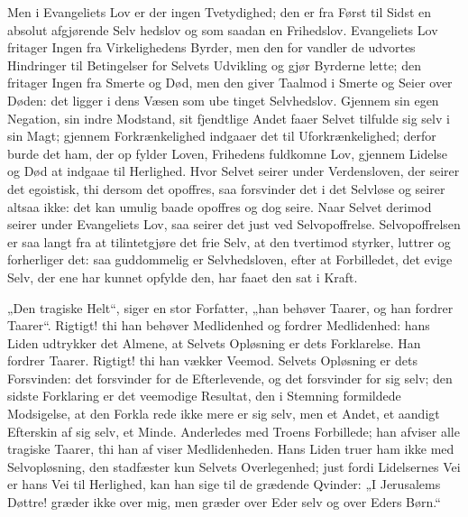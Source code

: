 \documentclass[12pt]{book}
\newcommand{\opage}[1]{\marginnote{\footnotesize\textit{[#1]}}}
\begin{document}
Men i Evangeliets Lov er der ingen Tvetydighed;
den er fra Først til Sidst en absolut afgjørende Selv\-%
hedslov og som saadan en Frihedslov. Evangeliets Lov
fritager Ingen fra Virkelighedens Byrder, men den for\-%
vandler de udvortes Hindringer til Betingelser for Selvets
Udvikling og gjør Byrderne lette; den fritager Ingen
fra Smerte og Død, men den giver Taalmod i Smerte
og Seier over Døden: det ligger i dens Væsen som ube\-%
tinget Selvhedslov. Gjennem sin egen Negation, sin
indre Modstand, sit fjendtlige Andet faaer Selvet tilfulde
sig selv i sin Magt; gjennem Forkrænkelighed indgaaer
det til Uforkrænkelighed; derfor burde det ham, der op\-%
fylder Loven, Frihedens fuldkomne Lov, gjennem Lidelse
og Død at indgaae til Herlighed. Hvor Selvet seirer
under Verdensloven, der seirer det egoistisk, thi dersom
det opoffres, saa forsvinder det i det Selvløse og seirer
altsaa ikke: det kan umulig baade opoffres og dog seire.
Naar Selvet derimod seirer under Evangeliets Lov, saa
seirer det just ved Selvopoffrelse. Selvopoffrelsen er saa
langt fra at tilintetgjøre det frie Selv, at den tvertimod
styrker, luttrer og forherliger det: saa guddommelig er
Selvhedsloven, efter at Forbilledet, det evige Selv, der ene
har kunnet opfylde den, har faaet den sat i Kraft.

„Den tragiske Helt“, siger en stor Forfatter, „han
behøver Taarer, og han fordrer Taarer“. Rigtigt! thi
han behøver Medlidenhed og fordrer Medlidenhed: hans
Liden udtrykker det Almene, at Selvets Opløsning er
dets Forklarelse. Han fordrer Taarer. Rigtigt! thi han
vækker Veemod. Selvets Opløsning er dets Forsvinden:
det forsvinder for de Efterlevende, og det forsvinder for
sig selv; den sidste Forklaring er det veemodige Resultat,
\opage{46}\setcounter{footnote}{0}%
den i Stemning formildede Modsigelse, at den Forkla\-%
rede ikke mere er sig selv, men et Andet, et aandigt
Efterskin af sig selv, et Minde. Anderledes med Troens
Forbillede; han afviser alle tragiske Taarer, thi han af\-%
viser Medlidenheden. Hans Liden truer ham ikke med
Selvopløsning, den stadfæster kun Selvets Overlegenhed;
just fordi Lidelsernes Vei er hans Vei til Herlighed,
kan han sige til de grædende Qvinder: „I Jerusalems
Døttre! græder ikke over mig, men græder over Eder
selv og over Eders Børn.“
\end{document}
